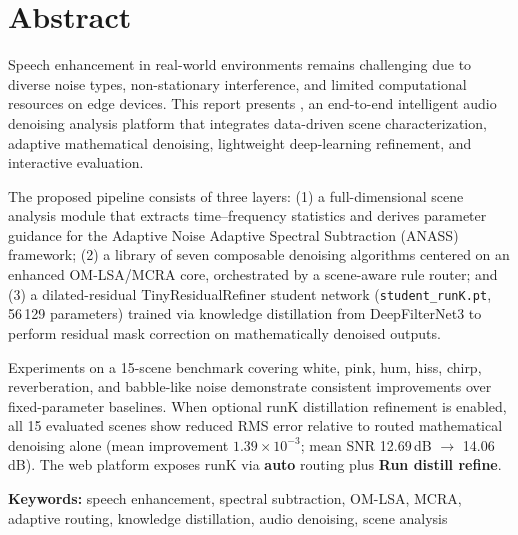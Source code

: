 \chapter*{Abstract}

Speech enhancement in real-world environments remains challenging due to diverse noise types, non-stationary interference, and limited computational resources on edge devices. This report presents \projectshort{}, an end-to-end intelligent audio denoising analysis platform that integrates data-driven scene characterization, adaptive mathematical denoising, lightweight deep-learning refinement, and interactive evaluation.

The proposed pipeline consists of three layers: (1) a full-dimensional scene analysis module that extracts time--frequency statistics and derives parameter guidance for the Adaptive Noise Adaptive Spectral Subtraction (ANASS) framework; (2) a library of seven composable denoising algorithms centered on an enhanced OM-LSA/MCRA core, orchestrated by a scene-aware rule router; and (3) a dilated-residual TinyResidualRefiner student network (\texttt{student\_runK.pt}, 56\,129 parameters) trained via knowledge distillation from DeepFilterNet3 to perform residual mask correction on mathematically denoised outputs.

Experiments on a 15-scene benchmark covering white, pink, hum, hiss, chirp, reverberation, and babble-like noise demonstrate consistent improvements over fixed-parameter baselines. When optional runK distillation refinement is enabled, all 15 evaluated scenes show reduced RMS error relative to routed mathematical denoising alone (mean improvement $1.39\times10^{-3}$; mean SNR 12.69\,dB $\to$ 14.06\,dB). The web platform exposes runK via \textbf{auto} routing plus \textbf{Run distill refine}.

\vspace{1em}
\noindent\textbf{Keywords:} speech enhancement, spectral subtraction, OM-LSA, MCRA, adaptive routing, knowledge distillation, audio denoising, scene analysis
